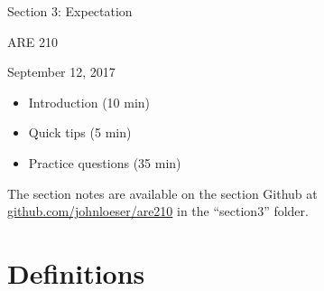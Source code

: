 \documentclass[12pt,english]{article}
\begin{document}
\begin{center}
{\Large{}Section 3: Expectation}
\par\end{center}{\Large \par}

\begin{center}
ARE 210
\par\end{center}

\begin{center}
September 12, 2017
\par\end{center}

\begin{itemize}
	\item Introduction (10 min)
	\item Quick tips (5 min)
	\item Practice questions (35 min)
\end{itemize}
The section notes are available on the section Github at \href{github.com/johnloeser/are210}{github.com/johnloeser/are210} in the ``section3'' folder.

\section{Definitions}
\end{document}
